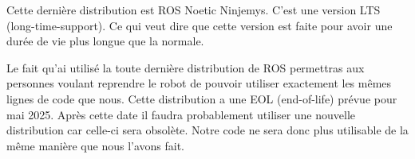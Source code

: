 Cette dernière distribution est ROS Noetic Ninjemys. C'est une version LTS (long-time-support). Ce qui veut dire que cette version est faite pour avoir une durée de vie plus longue que la normale.\\


Le fait qu'ai utilisé la toute dernière distribution de ROS permettras aux personnes voulant reprendre le robot de pouvoir utiliser exactement les mêmes lignes de code que nous. Cette distribution a une EOL (end-of-life) prévue pour mai 2025. Après cette date il faudra probablement utiliser une nouvelle distribution car celle-ci sera obsolète. Notre code ne sera donc plus utilisable de la même manière que nous l'avons fait.



